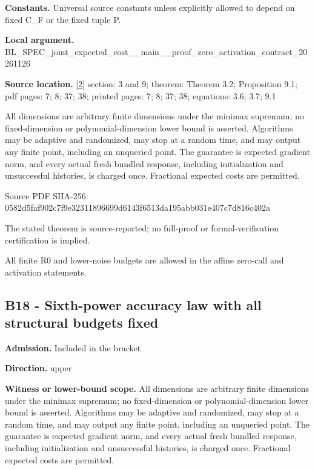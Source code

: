 \documentclass[10pt,a4paper]{article}
\begin{document}
\textbf{Constants.} Universal source constants unless explicitly allowed to depend on fixed C\_F or the fixed tuple P.



\textbf{Local argument.} BL\_SPEC\_joint\_expected\_c\allowbreak{}ost\_\_main\_\_proof\_zero\_ac\allowbreak{}tivation\_contract\_202611\allowbreak{}26



\textbf{Source location.} \href{https://github.com/WU-Wendao/Colombo/blob/main/colombo_sensorium/Complexity_altas/data/sources/colombo/SFO_JOINT_20261126/manuscript.pdf}{[2]} section: 3 and 9; theorem: Theorem 3.2; Proposition 9.1; pdf pages: 7; 8; 37; 38; printed pages: 7; 8; 37; 38; equations: 3.6; 3.7; 9.1



All dimensions are arbitrary finite dimensions under the minimax supremum; no fixed-dimension or polynomial-dimension lower bound is asserted. Algorithms may be adaptive and randomized, may stop at a random time, and may output any finite point, including an unqueried point. The guarantee is expected gradient norm, and every actual fresh bundled response, including initialization and unsuccessful histories, is charged once. Fractional expected costs are permitted.



Source PDF SHA-256: 0582d5faf902c7f9e3231189\allowbreak{}6699d6143f6513da195abb03\allowbreak{}1e407c7d816c402a



The stated theorem is source-reported; no full-proof or formal-verification certification is implied.



All finite R0 and lower-noise budgets are allowed in the affine zero-call and activation statements.



\subsection{B18 - Sixth-power accuracy law with all structural budgets fixed}


\textbf{Admission.} Included in the bracket



\textbf{Direction.} upper



\textbf{Witness or lower-bound scope.} All dimensions are arbitrary finite dimensions under the minimax supremum; no fixed-dimension or polynomial-dimension lower bound is asserted. Algorithms may be adaptive and randomized, may stop at a random time, and may output any finite point, including an unqueried point. The guarantee is expected gradient norm, and every actual fresh bundled response, including initialization and unsuccessful histories, is charged once. Fractional expected costs are permitted.
\end{document}
